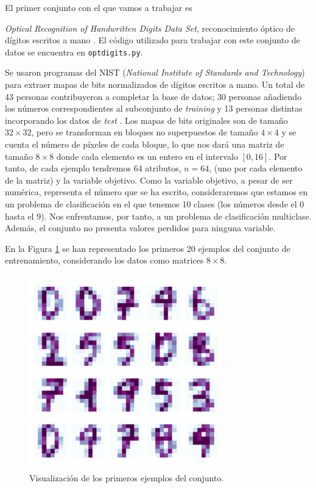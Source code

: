 \documentclass[a4paper, 20pt]{article}
\newcommand{\training}{\textit{training }}
\newcommand{\test}{\textit{test }}
\begin{document}
El primer conjunto con el que vamos a trabajar es {\textit{Optical Recognition of Handwritten Digits Data Set}, reconocimiento óptico de dígitos escritos a mano \cite{opt_uci}. El código utilizado para trabajar con este conjunto de datos se encuentra en \texttt{optdigits.py}.

Se usaron programas del NIST (\textit{National Institute of Standards and Technology}) para extraer mapas de bits normalizados de dígitos escritos a mano. Un total de 43 personas contribuyeron a completar la base de datos; 30 personas añadiendo los números correspondientes al subconjunto de \training y 13 personas distintas incorporando los datos  de \test. Los mapas de bits originales son de tamaño $32\times 32$, pero se transforman en bloques no superpuestos de tamaño $4\times 4$ y se cuenta el número de píxeles de cada bloque, lo que nos dará una matriz de tamaño $8\times 8$ donde cada elemento es un entero en el intervalo $[0,16]$. Por tanto, de cada ejemplo tendremos 64 atributos, $n=64$, (uno por cada elemento de la matriz) y la variable objetivo. Como la variable objetivo, a pesar de ser numérica, representa el número que se ha escrito, consideraremos que estamos en un problema de clasificación en el que tenemos 10 clases (los números desde el 0 hasta el 9). Nos enfrentamos, por tanto, a un problema de clasificación multiclase. Además, el conjunto no presenta valores perdidos para ninguna variable.

En la Figura \ref{fig:digs} se han representado los primeros 20 ejemplos del conjunto de entrenamiento, considerando los datos como matrices $8\times 8$.

\begin{figure}[H]
    \centering
    \includegraphics[width=0.75\textwidth]{Digits}
    \caption{Visualización de los primeros ejemplos del conjunto.}
    \label{fig:digs}
\end{figure}

}
\end{document}
